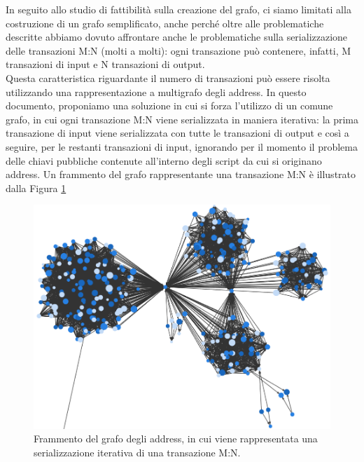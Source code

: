  In seguito allo studio di fattibilità sulla creazione del grafo, ci siamo limitati alla costruzione di un grafo semplificato, anche perché oltre alle problematiche descritte abbiamo dovuto affrontare anche le problematiche sulla serializzazione delle transazioni M:N (molti a molti): ogni transazione può contenere, infatti, M transazioni di input e N transazioni di output.\\
 Questa caratteristica riguardante il numero di transazioni può essere risolta utilizzando una rappresentazione a multigrafo degli address.
 In questo documento, proponiamo una soluzione in cui si forza l'utilizzo di un comune grafo, in cui ogni transazione M:N viene serializzata in maniera iterativa: la prima transazione di input viene serializzata con tutte le transazioni di output e così a seguire, per le restanti transazioni di input, ignorando per il momento il problema delle chiavi pubbliche contenute all'interno degli script da cui si originano address.
 Un frammento del grafo rappresentante una transazione M:N è illustrato dalla Figura \ref{fig:iterativeAddTx}

\begin{figure}
\centering
 \includegraphics[scale=0.35]{images/demo/iterationTx.png}
 \caption{Frammento del grafo degli address, in cui viene rappresentata una serializzazione iterativa di una transazione M:N.}
 \label{fig:iterativeAddTx}
\end{figure}

